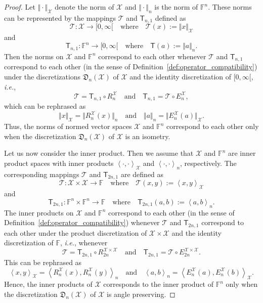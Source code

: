 \documentclass[a4paper]{paper}
\newcommand{\Discr}{\mathfrak{D}}
\newcommand{\Spc}[1]{\mathscr{#1}}
\newcommand{\Field}{\mathbb{F}}
\newcommand{\Op}[1]{\mathcal{#1}}
\newcommand{\DiscOp}[1]{\mathsf{#1}}
\newcommand*{\EXT}[2]{\ensuremath{E_{#1}^{#2}}}
\newcommand*{\REST}[2]{\ensuremath{R_{#1}^{#2}}}
\newcommand*{\RnX}{\ensuremath{\REST{n}{\Spc{X}}}}
\newcommand*{\EnX}{\ensuremath{\EXT{n}{\Spc{X}}}}
\newcommand{\ip}[2]{\left \langle #1,#2 \right\rangle}
\newcommand{\ie}{\textsl{i.e.}\xspace}
\begin{document}
\begin{proof}
Let $\Vert \cdot \Vert_{\Spc{X}}$ denote the norm of $\Spc{X}$ and $\Vert \cdot \Vert_{n}$ is the 
norm of $\Field^{n}$. These norms can be represented by the mappings $\Op{T}$ and $\DiscOp{T}_{n,1}$ 
defined as  
\[ \Op{T} \colon \Spc{X}  \to [0,\infty[  \quad\text{where}\quad \Op{T}(x):=\Vert x \Vert_{\Spc{X}} \] 
and 
\[ \DiscOp{T}_{n,1} \colon \Field^{n} \to [0,\infty[  \quad\text{where}\quad \DiscOp{T}(a):=\Vert a \Vert_{n}. \] 
Then the norms on $\Spc{X}$ and $\Field^{n}$ 
correspond to each other whenever $\Op{T}$ and $\DiscOp{T}_{n,1}$ correspond to each other 
(in the sense of Definition~\ref{def:operator_compatibility}) 
under the discretizations $\Discr_{n}(\Spc{X})$ of $\Spc{X}$ 
and the identity discretization of  $[0,\infty[$, \ie,
\[  \Op{T} =  \DiscOp{T}_{n,1} \circ \RnX
   \quad\text{and}\quad 
   \DiscOp{T}_{n,1} =  \Op{T} \circ \EnX,
\]
which can be rephrased as
\[ \Vert x \Vert_{\Spc{X}} = \bigl\Vert \RnX(x) \bigr\Vert_{n}
    \quad \text{and}\quad
   \Vert a \Vert_{n} = \bigl\Vert \EnX(a) \bigr\Vert_{\Spc{X}}.
\]
Thus, the norms of normed vector spaces $\Spc{X}$ and $\Field^{n}$ correspond
to each other only when the discretization $\Discr_{n}(\Spc{X})$ of $\Spc{X}$ is an isometry. 

Let us now consider the inner product. Then we assume that $\Spc{X}$ and $\Field^{n}$ are inner 
product spaces with inner products $\ip{\cdot}{\cdot}_\Spc{X}$ and $\ip{\cdot}{\cdot}_{n}$, 
respectively. The corresponding mappings $\Op{T}$ and $\DiscOp{T}_{2n,1}$ are 
defined as  
\[ \Op{T} \colon \Spc{X} \times \Spc{X}  \to \Field  \quad\text{where}\quad \Op{T}(x,y):=\ip{x}{y}_{\Spc{X}} \] 
and 
\[ \DiscOp{T}_{2n,1} \colon \Field^{n} \times \Field^{n}  \to \Field  \quad\text{where}\quad 
\DiscOp{T}_{2n,1}(a,b):=\ip{a}{b}_{n}. \] 
The inner products on $\Spc{X}$ and $\Field^{n}$ 
correspond to each other (in the sense of Definition~\ref{def:operator_compatibility})
whenever $\Op{T}$ and $\DiscOp{T}_{2n,1}$ correspond to each other 
under the product discretization of $\Spc{X}\times \Spc{X}$ and the identity discretization of 
$\Field$, \ie, whenever 
\[ \Op{T} =  \DiscOp{T}_{2n,1} \circ R_{2n}^{\Spc{X}\times \Spc{X}} 
   \quad\text{and}\quad 
   \DiscOp{T}_{2n,1} =  \Op{T} \circ E_{2n}^{\Spc{X}\times \Spc{X}}.
\]
This can be rephrased as
\[ \ip{x}{y}_{\Spc{X}} =  \ip{\RnX(x)}{\RnX(y)}_{n}
    \quad\text{and}\quad 
   \ip{a}{b}_{n} = \ip{\EnX(a)}{\EnX(b)}_{\Spc{X}}.
\]
Hence, the inner products of $\Spc{X}$ corresponds to the inner product of $\Field^{n}$ 
only when the discretization $\Discr_{n}(\Spc{X})$ of $\Spc{X}$ is angle preserving.
\end{proof}
\end{document}
